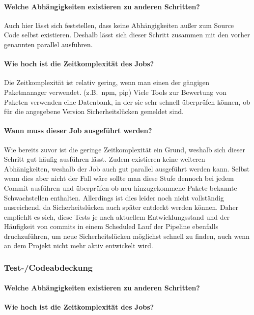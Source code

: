 \paragraph{Welche Abhängigkeiten existieren zu anderen Schritten?}

Auch hier lässt sich feststellen, dass keine Abhängigkeiten außer zum Source Code selbst existieren.
Deshalb lässt sich dieser Schritt zusammen mit den vorher genannten parallel ausführen.

\paragraph{Wie hoch ist die Zeitkomplexität des Jobs?}

Die Zeitkomplexität ist relativ gering, wenn man einen der gängigen Paketmanager verwendet. (z.B.\ npm, pip)
Viele Tools zur Bewertung von Paketen verwenden eine Datenbank, in der sie sehr schnell überprüfen können, ob für die angegebene Version Sicherheitslücken gemeldet sind.

\paragraph{Wann muss dieser Job ausgeführt werden?}

Wie bereits zuvor ist die geringe Zeitkomplexität ein Grund, weshalb sich dieser Schritt gut häufig ausführen lässt.
Zudem existieren keine weiteren Abhänigkeiten, weshalb der Job auch gut parallel ausgeführt werden kann.
Selbst wenn dies aber nicht der Fall wäre sollte man diese Stufe dennoch bei jedem Commit ausführen und überprüfen ob neu hinzugekommene Pakete bekannte Schwachstellen enthalten.
Allerdings ist dies leider noch nicht vollständig ausreichend, da Sicherheitslücken auch später entdeckt werden können.
Daher empfiehlt es sich, diese Tests je nach aktuellem Entwicklungsstand und der Häufigkeit von commits in einem Scheduled Lauf der Pipeline ebenfalls druchzuführen, um neue Sicherheitslücken möglichst schnell zu finden, auch wenn an dem Projekt nicht mehr aktiv entwickelt wird.

\subsubsection{Test-/Codeabdeckung}
\paragraph{Welche Abhängigkeiten existieren zu anderen Schritten?}
\paragraph{Wie hoch ist die Zeitkomplexität des Jobs?}
